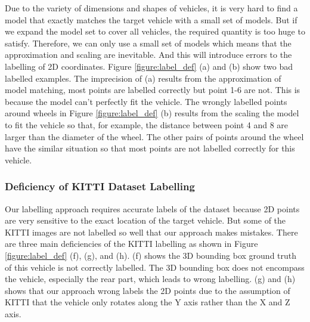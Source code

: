 \documentclass[a4paper,12pt]{article}
\begin{document}
Due to the variety of dimensions and shapes of vehicles, it is very hard to find a model that exactly matches the target vehicle with a small set of models. But if we expand the model set to cover all vehicles, the required quantity is too huge to satisfy. Therefore, we can only use a small set of models which means that the approximation and scaling are inevitable. And this will introduce errors to the labelling of 2D coordinates. Figure \ref{figure:label_def} (a) and (b) show two bad labelled examples. The imprecision of (a) results from the approximation of model matching, \ie most points are labelled correctly but point 1-6 are not. This is because the model can't perfectly fit the vehicle. The wrongly labelled points around wheels in Figure \ref{figure:label_def} (b) results from the scaling the model to fit the vehicle so that, for example, the distance between point 4 and 8 are larger than the diameter of the wheel. The other pairs of points around the wheel have the similar situation so that most points are not labelled correctly for this vehicle.

\subsubsection{Deficiency of KITTI Dataset Labelling}
Our labelling approach requires accurate labels of the dataset because 2D points are very sensitive to the exact location of the target vehicle. But some of the KITTI images are not labelled so well that our approach makes mistakes. There are three main deficiencies of the KITTI labelling as shown in Figure \ref{figure:label_def} (f), (g), and (h). (f) shows the 3D bounding box ground truth of this vehicle is not correctly labelled. The 3D bounding box does not encompass the vehicle, especially the rear part, which leads to wrong labelling. (g) and (h) shows that our approach wrong labels the 2D points due to the assumption of KITTI that the vehicle only rotates along the Y axis rather than the X and Z axis.
\end{document}
